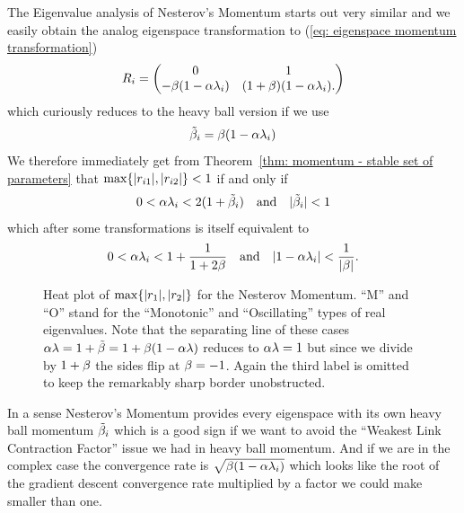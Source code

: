The Eigenvalue analysis of Nesterov's Momentum starts out very similar and we
easily obtain the analog eigenspace transformation to (\ref{eq: eigenspace
momentum transformation})
%
\begin{align*}
	R_i = \begin{pmatrix}
		0 & 1\\
		-\beta(1-\alpha\lambda_i) & (1+\beta)(1-\alpha\lambda_i).
	\end{pmatrix}	
\end{align*}
%
which curiously reduces to the heavy ball version if we use
\begin{align}\label{eq: tilde momentum}
	\tilde{\beta}_i = \beta(1-\alpha\lambda_i)
\end{align}
We therefore immediately get from Theorem~\ref{thm: momentum - stable set of
parameters} that \(\max\{|r_{i1}|,|r_{i2}|\}<1\) if and only if
\begin{align*}
	0<\alpha\lambda_i < 2(1+\tilde{\beta}_i)
	\quad \text{and} \quad
	|\tilde{\beta}_i|<1
\end{align*}
%
which after some transformations is itself equivalent to
\begin{align*}
	0<\alpha\lambda_i < 1+\frac{1}{1+2\beta}
	\quad \text{and} \quad
	|1-\alpha\lambda_i|<\frac{1}{|\beta|}.
\end{align*}
%
\begin{figure}[h]
	\centering
	\def\svgwidth{1\textwidth}
	
	\caption{
		Heat plot of \(\max\{|r_1|,|r_2|\}\) for the Nesterov Momentum.
		``M'' and ``O'' stand for the ``Monotonic'' and ``Oscillating'' types of 
		real eigenvalues. Note that the separating line of these cases
		\(\alpha\lambda=1+\tilde{\beta}=1+\beta(1-\alpha\lambda)\)
		reduces to \(\alpha\lambda=1\) but since we divide by \(1+\beta\)
		the sides flip at \(\beta=-1\). Again the third label is omitted to
		keep the remarkably sharp border unobstructed.
	}
	\label{fig: annotated nesterov rates}
\end{figure}

In a sense Nesterov's Momentum provides every eigenspace with its own
heavy ball momentum \(\tilde{\beta}_i\) which is a good sign if we want
to avoid the ``Weakest Link Contraction Factor'' issue we had in heavy ball
momentum. And if we are in the complex case the convergence rate is
\(\sqrt{\beta(1-\alpha\lambda_i)}\) which looks like the root of the
gradient descent convergence rate multiplied by a factor we could make smaller
than one.

